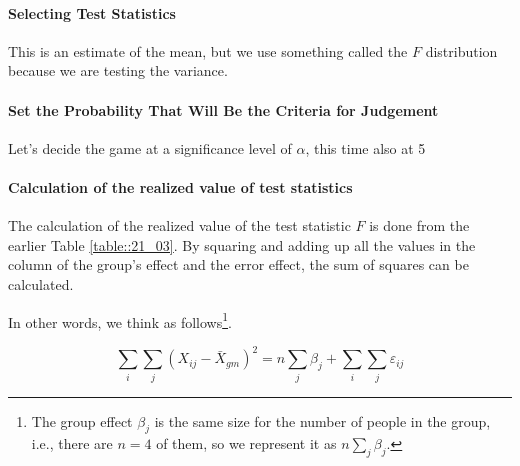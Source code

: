 \documentclass{ltjbook}
\begin{document}
\paragraph{Selecting Test Statistics}
This is an estimate of the mean, but we use something called the $F$ distribution because we are testing the variance.
\paragraph{Set the Probability That Will Be the Criteria for Judgement} Let's decide the game at a significance level of $\alpha$, this time also at 5%
\paragraph{Calculation of the realized value of test statistics} The calculation of the realized value of the test statistic $F$ is done from the earlier Table \ref{table::21_03}. By squaring and adding up all the values in the column of the group's effect and the error effect, the sum of squares can be calculated.

In other words, we think as follows\footnote{The group effect $\beta_j$ is the same size for the number of people in the group, i.e., there are $n=4$ of them, so we represent it as $n\sum_j \beta_j$.}.

\[\sum_{i}\sum_{j} (X_{ij} - \bar{X}_{gm})^2 = n\sum_j \beta_j + \sum_{i}\sum_{j} \varepsilon_{ij} \]
\end{document}
